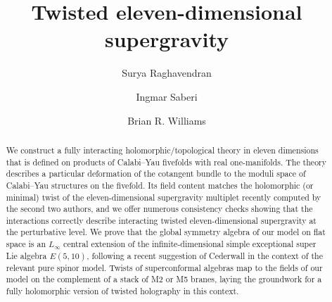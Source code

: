 \documentclass[11pt,a4paper]{amsart}
\begin{document}
\title{Twisted eleven-dimensional supergravity}

\author{Surya Raghavendran}
\address{Perimeter Institute for Theoretical Physics \\ 31 Caroline Street North \\ 
Waterloo, Ontario N2L 2Y5\\ Canada}

\author{Ingmar Saberi}
\address{Ludwig-Maximilians-Universit\"at M\"unchen \\ Fakult\"at f\"ur Physik \\ Theresienstra\ss{}e 37 \\ 80333 M\"unchen \\ Deutschland}

\author{Brian R. Williams}
\address{School of Mathematics \\ University of Edinburgh \\ Edinburgh EH9 3FD \\ Scotland}

\begin{abstract}
We construct a fully interacting holomorphic/topological theory in eleven dimensions that is defined on products of Calabi--Yau fivefolds with real one-manifolds. 
The theory describes a particular deformation of the cotangent bundle to the moduli space of Calabi--Yau structures on the fivefold.
Its field content matches the holomorphic (or minimal) twist of the 
eleven-dimensional supergravity multiplet recently computed by the second two authors, and we offer numerous consistency checks showing that the interactions correctly describe interacting twisted eleven-dimensional supergravity at the perturbative level. 
We prove that the global symmetry algebra of our model on flat space is an $L_\infty$ central extension of the infinite-dimensional simple exceptional super Lie algebra $E(5,10)$, following a recent suggestion of Cederwall in the context of the relevant pure spinor model. 
Twists of superconformal algebras map to the fields of our model on the complement of a stack of M2 or M5 branes, laying the groundwork for a fully holomorphic version of twisted holography in this context.
\end{abstract}
\maketitle

\vfill\eject

\setcounter{tocdepth}{1}
\tableofcontents

 














\printbibliography
\end{document}
